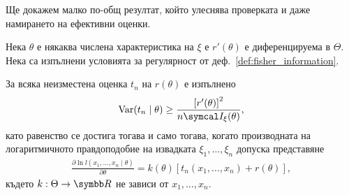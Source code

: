 \documentclass[numbers=endperiod, bibliography=totocnumbered]{scrartcl}
\begin{document}
Ще докажем малко по-общ резултат, който улеснява проверката и даже намирането на ефективни оценки.
\begin{theorem}\label{thm:rao_cramer}
  Нека \( \theta \) е някаква числена характеристика на \( \xi \) е \( r'(\theta) \) е диференцируема в \( \Theta \). Нека са изпълнени условията за регулярност от деф.~\ref{def:fisher_information}.

  За всяка неизместена оценка \( t_n \) на \( r(\theta) \) е изпълнено
  \begin{align*}
    \Var(t_n \mid \theta) \geq \frac {{\left[r'(\theta) \right]}^2} {n \FisherInfo_\xi(\theta)},
  \end{align*}
  като равенство се достига тогава и само тогава, когато производната на логаритмичното правдоподобие на извадката \( \xi_1, \ldots, \xi_n \) допуска представяне
  \begin{align*}
    \frac {\partial \ln l(x_1, \ldots, x_n \mid \theta)} {\partial \theta}
    =
    k(\theta) [t_n(x_1, \ldots, x_n) + r(\theta)],
  \end{align*}
  където \( k: \Theta \to \R \) не зависи от \( x_1, \ldots, x_n \).
\end{theorem}
\end{document}
